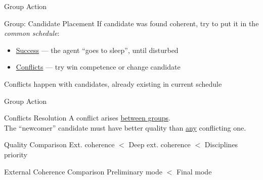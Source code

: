 \documentclass{beamer}
\providecommand{\rootdir}{../doc}
\newcommand{\green}[1]{{\color{green!50!black} #1}}
\newcommand{\resizeinput}[2][1]{%
  \resizebox{#1\textwidth}{!}{}%
}
\begin{document}
\begin{frame}{Group Action}
\end{frame}


\begin{frame}{Group: Candidate Placement}
  If candidate was found coherent, try to put it in the \emph{common schedule}:
  \begin{itemize}
    \item \underline{Success} --- the agent ``goes to \green{sleep}'', until disturbed
    \item \underline{Conflicts} --- try \alert{win competence} or change candidate
  \end{itemize}
  \begin{block}{Conflicts}
    happen with candidates, already existing in current schedule
  \end{block}
  \centering
  \marginbox{-30pt 0 0 0}{
    \resizeinput[.5]{\rootdir/img/ConnectionMatrix/Conflict-content.tikz}
  }
\end{frame}


\begin{frame}{Group Action}
\end{frame}


\begin{frame}{Conflicts Resolution}
  A conflict arises \underline{between groups}.
  \\\medskip
  The ``newcomer'' candidate must have better quality than \underline{any}
  conflicting one.
  \\\bigskip
  \begin{block}{Quality Comparison}
    \centering \bigskip
    Ext. coherence $<$ Deep ext. coherence $<$ Disciplines priority
  \end{block}
  \medskip
  \begin{block}{External Coherence Comparison}
    \centering \bigskip
    Preliminary mode $<$ Final mode
  \end{block}
\end{frame}
\end{document}
